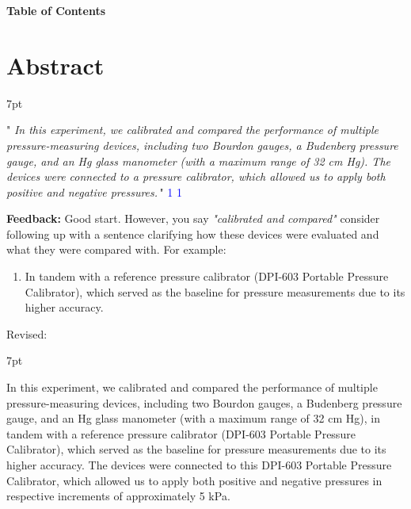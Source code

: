 \documentclass{article}
\newcommand{\formalsource}{} %
\newenvironment{formal}[3][]{%
	\renewcommand{\formalsource}{#1}%
	\def\FrameCommand{%
		\hspace{1pt}%
		{\color{#2}\vrule width 2pt}%
		{\color{#3}\vrule width 4pt}%
		\colorbox{#3}%
	}%
	\MakeFramed{\advance\hsize-\width\FrameRestore}%
	\noindent\hspace{-4.55pt}%
	\begin{adjustwidth}{}{7pt}%
		\vspace{2pt}%
	}%
	{%
		\vspace{4pt}%
		\ifx\formalsource\empty %
		\else
		\hfill{\footnotesize{\formalsource}}%
		\fi
	\end{adjustwidth}\endMakeFramed%
}
\begin{document}
	\normalsize
	\newpage{}
	\noindent\vspace{0em}
	\begin{center}
		\LARGE \textbf{Table of Contents}\\[-7em]
	\end{center}
	{
		\hypersetup{linkcolor=black}
		\tableofcontents
	}    
	
	
	\large\newpage\restoregeometry\vspace*{-20pt}
	
	\noindent
	
\section{Abstract}
\begin{formal}[\textcolor{blue}{1}]{blue!40!black}{blue!10!white}
	\Large" \large \textit{In this experiment, we calibrated and compared the performance of multiple pressure-measuring devices, including two Bourdon gauges, a Budenberg pressure gauge, and an Hg glass manometer (with a maximum range of 32 cm Hg). The devices were connected to a pressure calibrator, which allowed us to apply both positive and negative pressures.}\Large\," \large   
\end{formal}
\textbf{Feedback:} Good start. However, you say \textit{"calibrated and compared"} consider following up with a sentence clarifying how these devices were evaluated and what they were compared with. For example:
\begin{enumerate}
	\item In tandem with a reference pressure calibrator (DPI-603 Portable Pressure Calibrator), which served as the baseline for pressure measurements due to its higher accuracy.  
\end{enumerate}
Revised:
\begin{formal}{green!40!black}{green!10!white}
	In this experiment, we calibrated and compared the performance of multiple pressure-measuring devices, including two Bourdon gauges, a Budenberg pressure gauge, and an Hg glass manometer (with a maximum range of 32 cm Hg), in tandem with a reference pressure calibrator (DPI-603 Portable Pressure Calibrator), which served as the baseline for pressure measurements due to its higher accuracy. The devices were connected to this DPI-603 Portable Pressure Calibrator, which allowed us to apply both positive and negative pressures in respective increments of approximately 5 kPa.
\end{formal}
\end{document}
